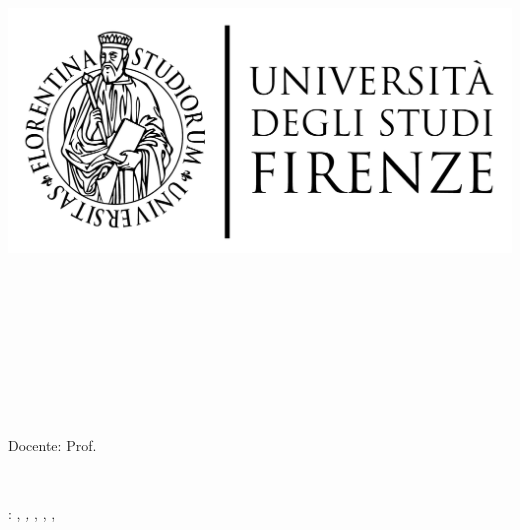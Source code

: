 \begin{titlepage}
\begin{center}

\large
\hfill
\vfill
      
\includegraphics[scale=0.15]{logo/LOGOUNIFI}\\
\vspace{0.5cm}
\myFaculty \\
\myDegree \\ 
\vspace{1.0cm}

\vfill
      
\begingroup
\color{Maroon}
\myItalianPretitle \\
\spacedallcaps{\myItalianTitle} \\
\bigskip
\endgroup
      
\vfill

\spacedlowsmallcaps{\myName}\\
\myMail \\
\myMatricola \\
      
\vfill 
\vfill
      
Docente: Prof. \emph{\myProfessor}\\
      
\vfill
\vfill
      
\myAY \\
\myTime
      
\vfill  
                        
\end{center}        
\end{titlepage}
  
\newpage
\thispagestyle{empty}
\hfill
\vfill
\noindent
\mycopyright: \myName, \textit{\myItalianPretitle \myItalianTitle,} \myVersione, \myUni, \myDegree, \myAY